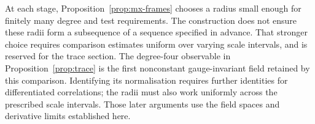 At each stage, Proposition~\ref{prop:mx-frames} chooses a radius small enough for finitely many degree and test requirements. The construction does not ensure these radii form a subsequence of a sequence specified in advance.
That stronger choice requires comparison estimates uniform over varying scale intervals, and is reserved for the trace section.
The degree-four observable in Proposition~\ref{prop:trace} is the first nonconstant gauge-invariant field retained by this comparison. Identifying its normalisation requires further identities for differentiated correlations; the radii must also work uniformly across the prescribed scale intervals.
Those later arguments use the field spaces and derivative limits established here.
